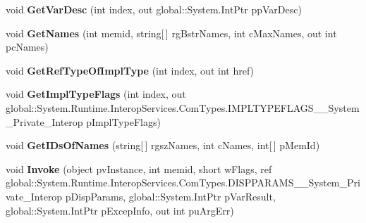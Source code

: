 \begin{DoxyCompactItemize}
void {\bfseries Get\+Var\+Desc} (int index, out global\+::\+System.\+Int\+Ptr pp\+Var\+Desc)
\item 
\mbox{\label{interface_system_1_1_runtime_1_1_interop_services_1_1_com_types_1_1_i_type_info_____system___private___interop_a161d5d3ddd1aa44629b27be7d6caaee7}} 
void {\bfseries Get\+Names} (int memid, string\mbox{[}$\,$\mbox{]} rg\+Bstr\+Names, int c\+Max\+Names, out int pc\+Names)
\item 
\mbox{\label{interface_system_1_1_runtime_1_1_interop_services_1_1_com_types_1_1_i_type_info_____system___private___interop_a6589519f0c86fa462b9a03ab2a78b59d}} 
void {\bfseries Get\+Ref\+Type\+Of\+Impl\+Type} (int index, out int href)
\item 
\mbox{\label{interface_system_1_1_runtime_1_1_interop_services_1_1_com_types_1_1_i_type_info_____system___private___interop_ae5c606ba7b1dd1ba41edfa764de5bf7f}} 
void {\bfseries Get\+Impl\+Type\+Flags} (int index, out global\+::\+System.\+Runtime.\+Interop\+Services.\+Com\+Types.\+I\+M\+P\+L\+T\+Y\+P\+E\+F\+L\+A\+G\+S\+\_\+\+\_\+\+System\+\_\+\+Private\+\_\+\+Interop p\+Impl\+Type\+Flags)
\item 
\mbox{\label{interface_system_1_1_runtime_1_1_interop_services_1_1_com_types_1_1_i_type_info_____system___private___interop_a6aa20dbdd253a9bb2b4072bf7d6ea031}} 
void {\bfseries Get\+I\+Ds\+Of\+Names} (string\mbox{[}$\,$\mbox{]} rgsz\+Names, int c\+Names, int\mbox{[}$\,$\mbox{]} p\+Mem\+Id)
\item 
\mbox{\label{interface_system_1_1_runtime_1_1_interop_services_1_1_com_types_1_1_i_type_info_____system___private___interop_a75ad94dc5c9adbb0a9b1de1c846b395e}} 
void {\bfseries Invoke} (object pv\+Instance, int memid, short w\+Flags, ref global\+::\+System.\+Runtime.\+Interop\+Services.\+Com\+Types.\+D\+I\+S\+P\+P\+A\+R\+A\+M\+S\+\_\+\+\_\+\+System\+\_\+\+Private\+\_\+\+Interop p\+Disp\+Params, global\+::\+System.\+Int\+Ptr p\+Var\+Result, global\+::\+System.\+Int\+Ptr p\+Excep\+Info, out int pu\+Arg\+Err)

\end{DoxyCompactItemize}
